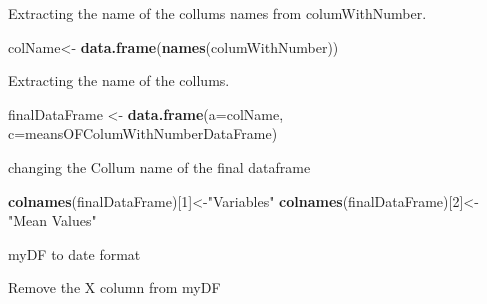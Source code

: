 \documentclass[]{book}
\newenvironment{Shaded}{\begin{snugshade}}{\end{snugshade}}
\newcommand{\KeywordTok}[1]{\textcolor[rgb]{0.13,0.29,0.53}{\textbf{#1}}}
\newcommand{\DataTypeTok}[1]{\textcolor[rgb]{0.13,0.29,0.53}{#1}}
\newcommand{\DecValTok}[1]{\textcolor[rgb]{0.00,0.00,0.81}{#1}}
\newcommand{\StringTok}[1]{\textcolor[rgb]{0.31,0.60,0.02}{#1}}
\newcommand{\OperatorTok}[1]{\textcolor[rgb]{0.81,0.36,0.00}{\textbf{#1}}}
\newcommand{\NormalTok}[1]{#1}
\begin{document}
Extracting the name of the collums names from columWithNumber.

\begin{Shaded}
\begin{Highlighting}[]
\NormalTok{colName<-}\StringTok{ }\KeywordTok{data.frame}\NormalTok{(}\KeywordTok{names}\NormalTok{(columWithNumber))}
\end{Highlighting}
\end{Shaded}

Extracting the name of the collums.

\begin{Shaded}
\begin{Highlighting}[]
\NormalTok{finalDataFrame <-}\StringTok{ }\KeywordTok{data.frame}\NormalTok{(}\DataTypeTok{a=}\NormalTok{colName, }\DataTypeTok{c=}\NormalTok{meansOFColumWithNumberDataFrame)}
\end{Highlighting}
\end{Shaded}

changing the Collum name of the final dataframe

\begin{Shaded}
\begin{Highlighting}[]
\KeywordTok{colnames}\NormalTok{(finalDataFrame)[}\DecValTok{1}\NormalTok{]<-}\StringTok{"Variables"}
\KeywordTok{colnames}\NormalTok{(finalDataFrame)[}\DecValTok{2}\NormalTok{]<-}\StringTok{"Mean Values"}
\end{Highlighting}
\end{Shaded}

myDF to date format

\begin{Shaded}
\end{Shaded}

Remove the X column from myDF

\begin{Shaded}
\end{Shaded}
\end{document}
